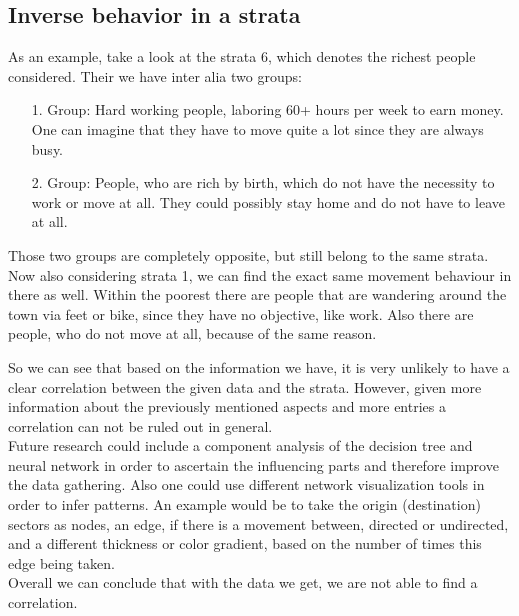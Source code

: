 	\subsection{Inverse behavior in a strata}
	As an example, take a look at the strata 6, which denotes the richest people considered. Their we have inter alia two groups: 
	\begin{enumerate}
		\setlength{\itemindent}{1cm}
		\item[1. Group:]
		Hard working people, laboring 60+ hours per week to earn money. One can imagine that they have to move quite a lot since they are always busy.
		\item[2. Group:]
		People, who are rich by birth, which do not have the necessity to work or move at all. They could possibly stay home and do not have to leave at all.
	\end{enumerate} 
	Those two groups are completely opposite, but still belong to the same strata. Now also considering strata 1, we can find the exact same movement behaviour in there as well. Within the poorest there are people that are wandering around the town via feet or bike, since they have no objective, like work. Also there are people, who do not move at all, because of the same reason.	
	
	So we can see that based on the information we have, it is very unlikely to have a clear correlation between the given data and the strata. However, given more information about the previously mentioned aspects and more entries a correlation can not be ruled out in general.\\
	Future research could include a component analysis of the decision tree and neural network in order to ascertain the influencing parts and therefore improve the data gathering. Also one could use different network visualization tools in order to infer patterns. An example would be to take the origin (destination) sectors as nodes, an edge, if there is a movement between, directed or undirected, and a different thickness or color gradient, based on the number of times this edge being taken.\\
	
	Overall we can conclude that with the data we get, we are not able to find a correlation.